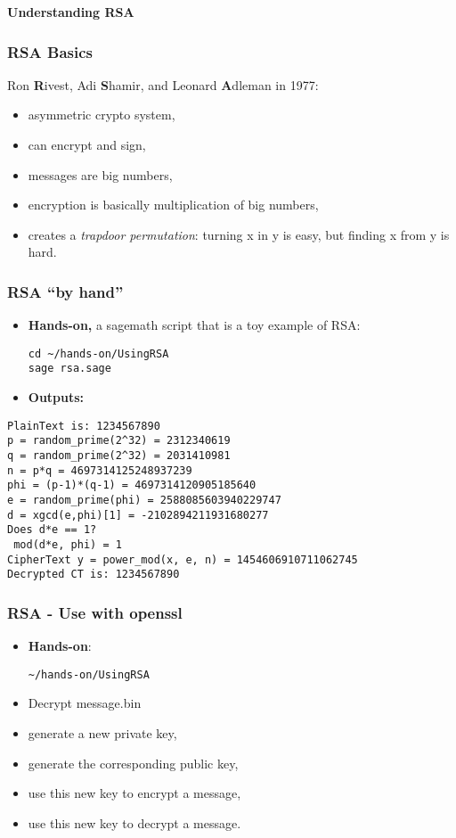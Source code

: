\begin{frame}
  \begin{center}
    {\bf Understanding RSA}
  \end{center}
\end{frame}

\begin{frame}
  \frametitle{RSA Basics}
  Ron {\bf R}ivest, Adi {\bf S}hamir, and Leonard {\bf A}dleman in 1977:
  \begin{itemize}
    \item asymmetric crypto system,
    \item can encrypt and sign,
    \item messages are big numbers,
    \item encryption is basically multiplication of big numbers,
    \item creates a \textit{trapdoor permutation}: turning x in y is easy, but
      finding x from y is hard.
  \end{itemize}

\end{frame}
\begin{frame}[fragile]
  \frametitle{RSA ``by hand''}
  \begin{itemize}
  \item {\bf Hands-on,} a sagemath script that is a toy example of RSA: 

\begin{lstlisting}
cd ~/hands-on/UsingRSA
sage rsa.sage
\end{lstlisting}
\item {\bf Outputs:}
\end{itemize}
\begin{lstlisting}[basicstyle=\tiny]
PlainText is: 1234567890
p = random_prime(2^32) = 2312340619
q = random_prime(2^32) = 2031410981
n = p*q = 4697314125248937239
phi = (p-1)*(q-1) = 4697314120905185640
e = random_prime(phi) = 2588085603940229747
d = xgcd(e,phi)[1] = -2102894211931680277
Does d*e == 1?
 mod(d*e, phi) = 1
CipherText y = power_mod(x, e, n) = 1454606910711062745
Decrypted CT is: 1234567890
\end{lstlisting}
\end{frame}

\begin{frame}[fragile]
  \frametitle{RSA - Use with openssl}
  \begin{itemize}
  \item {\bf Hands-on}:

\begin{lstlisting}
~/hands-on/UsingRSA
\end{lstlisting}

   \item Decrypt message.bin
   \item generate a new private key,
   \item generate the corresponding public key,
   \item use this new key to encrypt a message,
   \item use this new key to decrypt a message. 
   
  \end{itemize}
\end{frame}

